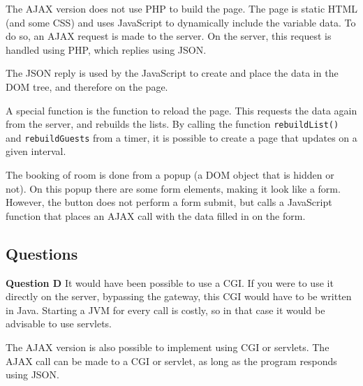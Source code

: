\documentclass[a4paper]{article}
\begin{document}
The AJAX version does not use PHP to build the page. The page is static HTML (and some CSS) and uses JavaScript
to dynamically include the variable data. To do so, an AJAX request is made to the server. On the server, this
request is handled using PHP, which replies using JSON.

The JSON reply is used by the JavaScript to create and place the data in the DOM tree, and therefore on the page.

A special function is the function to reload the page. This requests the data again from the server, and rebuilds
the lists. By calling the function \texttt{rebuildList()} and \texttt{rebuildGuests} from a timer, it is possible
to create a page that updates on a given interval.

The booking of room is done from a popup (a DOM object that is hidden or not). On this popup there are some form
elements, making it look like a form. However, the button does not perform a form submit, but calls a JavaScript
function that places an AJAX call with the data filled in on the form.

\subsection{Questions}

\textbf{Question D} It would have been possible to use a CGI. If you were to use it directly on the server,
bypassing the gateway, this CGI would have to be written in Java. Starting a JVM for every call is
costly, so in that case it would be advisable to use servlets.

The AJAX version is also possible to implement using CGI or servlets. The AJAX call can be made to a CGI or servlet,
as long as the program responds using JSON.
\end{document}
